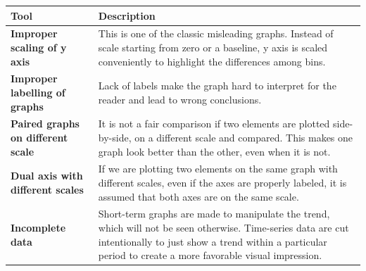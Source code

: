 \documentclass[]{book}
\theoremstyle{definition}
\theoremstyle{definition}
\theoremstyle{definition}
\theoremstyle{remark}
\begin{document}
\begin{longtable}[]{@{}ll@{}}
\toprule
\begin{minipage}[b]{0.16\columnwidth}\raggedright\strut
\textbf{Tool}\strut
\end{minipage} & \begin{minipage}[b]{0.78\columnwidth}\raggedright\strut
\textbf{Description}\strut
\end{minipage}\tabularnewline
\midrule
\endhead
\begin{minipage}[t]{0.16\columnwidth}\raggedright\strut
\textbf{Improper scaling of y axis}\strut
\end{minipage} & \begin{minipage}[t]{0.78\columnwidth}\raggedright\strut
This is one of the classic misleading graphs. Instead of scale starting
from zero or a baseline, y axis is scaled conveniently to highlight the
differences among bins.\strut
\end{minipage}\tabularnewline
\begin{minipage}[t]{0.16\columnwidth}\raggedright\strut
\textbf{Improper labelling of graphs}\strut
\end{minipage} & \begin{minipage}[t]{0.78\columnwidth}\raggedright\strut
Lack of labels make the graph hard to interpret for the reader and lead
to wrong conclusions.\strut
\end{minipage}\tabularnewline
\begin{minipage}[t]{0.16\columnwidth}\raggedright\strut
\textbf{Paired graphs on different scale}\strut
\end{minipage} & \begin{minipage}[t]{0.78\columnwidth}\raggedright\strut
It is not a fair comparison if two elements are plotted side-by-side, on
a different scale and compared. This makes one graph look better than
the other, even when it is not.\strut
\end{minipage}\tabularnewline
\begin{minipage}[t]{0.16\columnwidth}\raggedright\strut
\textbf{Dual axis with different scales}\strut
\end{minipage} & \begin{minipage}[t]{0.78\columnwidth}\raggedright\strut
If we are plotting two elements on the same graph with different scales,
even if the axes are properly labeled, it is assumed that both axes are
on the same scale.\strut
\end{minipage}\tabularnewline
\begin{minipage}[t]{0.16\columnwidth}\raggedright\strut
\textbf{Incomplete data}\strut
\end{minipage} & \begin{minipage}[t]{0.78\columnwidth}\raggedright\strut
Short-term graphs are made to manipulate the trend, which will not be
seen otherwise. Time-series data are cut intentionally to just show a
trend within a particular period to create a more favorable visual
impression.\strut
\end{minipage}\tabularnewline
\bottomrule
\end{longtable}
\end{document}
